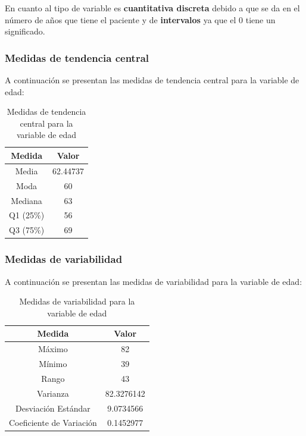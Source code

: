 \documentclass[a4paper,12pt]{article}
\begin{document}
    En cuanto al tipo de variable es \textbf{cuantitativa discreta} debido a que se da en el número de años que tiene el paciente y de \textbf{intervalos} ya que el 0 tiene un significado.    

    \subsubsection*{Medidas de tendencia central}

    A continuación se presentan las medidas de tendencia central para la variable de edad:
    
    \begin{table}[h!]
        \centering
        \begin{tabular}{|c|c|}
            \hline
            \textbf{Medida} & \textbf{Valor} \\
            \hline
            Media & 62.44737 \\
            \hline
            Moda & 60 \\
            \hline
            Mediana & 63 \\
            \hline
            Q1 (25\%) & 56 \\
            \hline
            Q3 (75\%) & 69 \\
            \hline
        \end{tabular}
        \caption{Medidas de tendencia central para la variable de edad}
        \label{tab:medidas_tendencia_central_edad}
    \end{table}
    
    \newpage
    \subsubsection*{Medidas de variabilidad}
    
    A continuación se presentan las medidas de variabilidad para la variable de edad:
    
    \begin{table}[h!]
        \centering
        \begin{tabular}{|c|c|}
            \hline
            \textbf{Medida} & \textbf{Valor} \\
            \hline
            Máximo & 82 \\
            \hline
            Mínimo & 39 \\
            \hline
            Rango & 43 \\
            \hline
            Varianza & 82.3276142 \\
            \hline
            Desviación Estándar & 9.0734566 \\
            \hline
            Coeficiente de Variación & 0.1452977 \\
            \hline
        \end{tabular}
        \caption{Medidas de variabilidad para la variable de edad}
        \label{tab:medidas_variabilidad_edad}
    \end{table}
\end{document}
